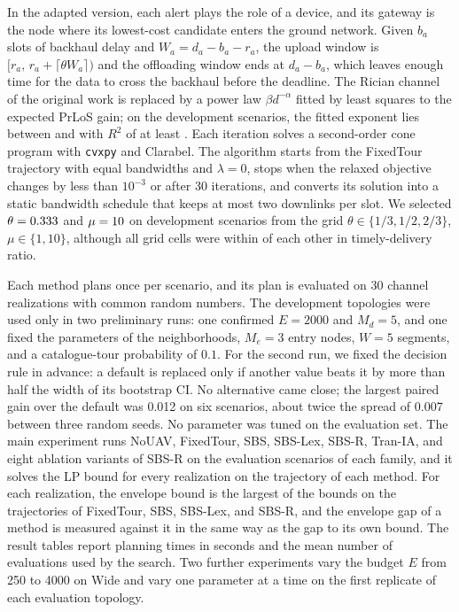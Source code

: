 

In the adapted version, each alert plays the role of a device, and its gateway is the node where its lowest-cost candidate enters the ground network. Given $b_a$ slots of backhaul delay and $W_a=d_a-b_a-r_a$, the upload window is $[r_a,\,r_a+\lceil\theta W_a\rceil)$ and the offloading window ends at $d_a-b_a$, which leaves enough time for the data to cross the backhaul before the deadline. The Rician channel of the original work is replaced by a power law $\beta d^{-\alpha}$ fitted by least squares to the expected PrLoS gain; on the development scenarios, the fitted exponent lies between \ResultExtFitAlphaMin{} and \ResultExtFitAlphaMax{} with $R^2$ of at least \ResultExtFitRsquaredMin. Each iteration solves a second-order cone program with \texttt{cvxpy} and Clarabel. The algorithm starts from the FixedTour trajectory with equal bandwidths and $\lambda=0$, stops when the relaxed objective changes by less than $10^{-3}$ or after 30 iterations, and converts its solution into a static bandwidth schedule that keeps at most two downlinks per slot. We selected $\theta=\num{0.333}$ and $\mu=\num{10}$ on \ResultExtPilotScenarioCount{} development scenarios from the grid $\theta\in\{1/3,1/2,2/3\}$, $\mu\in\{1,10\}$, although all grid cells were within \ResultExtPilotGridSpread{} of each other in timely-delivery ratio.

\label{sec:protocol}
Each method plans once per scenario, and its plan is evaluated on 30 channel realizations with common random numbers. The development topologies were used only in two preliminary runs: one confirmed $E=2000$ and $M_d=5$, and one fixed the parameters of the neighborhoods, $M_e=3$ entry nodes, $W=5$ segments, and a catalogue-tour probability of $0.1$. For the second run, we fixed the decision rule in advance: a default is replaced only if another value beats it by more than half the width of its bootstrap CI. No alternative came close; the largest paired gain over the default was \num{0.012} on six scenarios, about twice the spread of \num{0.007} between three random seeds. No parameter was tuned on the evaluation set. The main experiment runs NoUAV, FixedTour, SBS, SBS-Lex, SBS-R, Tran-IA, and eight ablation variants of SBS-R on the \ResultTwoScenarioCount{} evaluation scenarios of each family, and it solves the LP bound for every realization on the trajectory of each method. For each realization, the envelope bound is the largest of the bounds on the trajectories of FixedTour, SBS, SBS-Lex, and SBS-R, and the envelope gap of a method is measured against it in the same way as the gap to its own bound. The result tables report planning times in seconds and the mean number of evaluations used by the search. Two further experiments vary the budget $E$ from 250 to 4000 on Wide and vary one parameter at a time on the first replicate of each evaluation topology.

